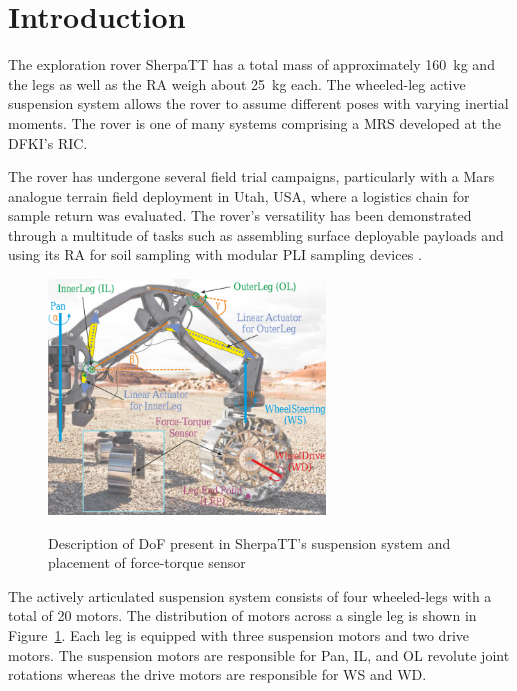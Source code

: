 \documentclass[twocolumn,letterpaper]{IEEEAerospaceCLS}  %
\newcommand{\refFig}[1]{{Figure}~\ref{#1}} %
\begin{document}
\tableofcontents

\section{Introduction}
The exploration rover SherpaTT has a total mass of approximately \SI{160}{\kilo\gram} and the legs as well as the \ac{RA} weigh about \SI{25}{\kilo\gram} each. The wheeled-leg active suspension system allows the rover to assume different poses with varying inertial moments. The rover is one of many systems comprising a \ac{MRS} developed at the \ac{DFKI}'s \ac{RIC}.

The rover has undergone several field trial campaigns, particularly with a Mars analogue terrain field deployment in Utah, USA, where a logistics chain for sample return was evaluated. The rover's versatility has been demonstrated through a multitude of tasks such as assembling surface deployable payloads and using its \ac{RA} for soil sampling with modular \ac{PLI} sampling devices \cite{Cordes2018b}.

\begin{figure}[h]
  \centering
  \includegraphics[width=2.9in]{figures/images/sherpatt-actively-articulated-suspension-sytem.png}\\
  \caption{Description of DoF present in SherpaTT’s
suspension system and placement of force-torque sensor}
  \label{fig:sherpatt-actively-articulated-suspension-system}
\end{figure}

The actively articulated suspension system consists of four wheeled-legs with a total of 20 motors. The distribution of motors across a single leg is shown in \refFig{fig:sherpatt-actively-articulated-suspension-system}. Each leg is equipped with three suspension motors and two drive motors. The suspension motors are responsible for Pan, \ac{IL}, and \ac{OL} revolute joint rotations whereas the drive motors are responsible for \ac{WS} and \ac{WD}.
\end{document}
